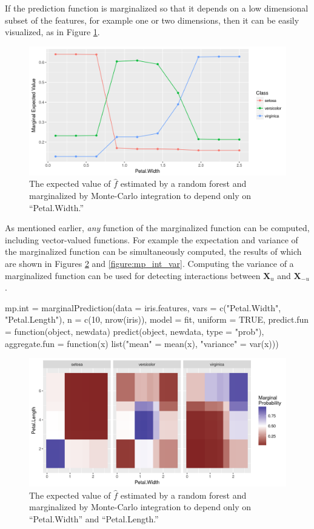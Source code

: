 If the prediction function is marginalized so that it depends on a low dimensional subset of the features, for example one or two dimensions, then it can be easily visualized, as in Figure \ref{figure:mp}.

\begin{figure}
  \includegraphics[width=\textwidth]{mp.png}
  \caption{The expected value of $\hat{f}$ estimated by a random forest and marginalized by Monte-Carlo integration to depend only on ``Petal.Width.'' \label{figure:mp}}
\end{figure}

As mentioned earlier, \textit{any} function of the marginalized function can be computed, including vector-valued functions. For example the expectation and variance of the marginalized function can be simultaneously computed, the results of which are shown in Figures \ref{figure:mp_int_mean} and \ref{figure:mp_int_var}. Computing the variance of a marginalized function can be used for detecting interactions between $\mathbf{X}_u$ and $\mathbf{X}_{-u}$ \citep{goldstein2015peeking}.

\begin{example}
mp.int = marginalPrediction(data = iris.features,
  vars = c("Petal.Width", "Petal.Length"),
  n = c(10, nrow(iris)), model = fit, uniform = TRUE,
  predict.fun = function(object, newdata) predict(object, newdata, type = "prob"),
  aggregate.fun = function(x) list("mean" = mean(x), "variance" = var(x)))
\end{example}

\begin{figure}
  \includegraphics[width=\textwidth]{mp_int_mean.png}
  \caption{The expected value of $\hat{f}$ estimated by a random forest and marginalized by Monte-Carlo integration to depend only on ``Petal.Width'' and ``Petal.Length.'' \label{figure:mp_int_mean}}
\end{figure}

